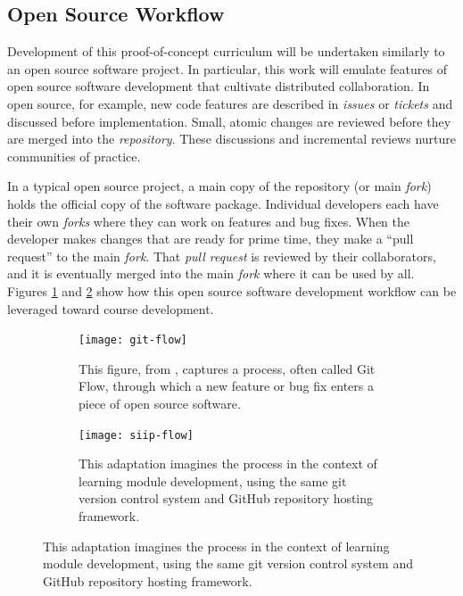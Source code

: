 \documentclass[11pt]{article}
\begin{document}
          \subsection{Open Source Workflow}
          Development of this proof-of-concept curriculum will be undertaken 
          similarly to an open source software project. 
          In particular, this work will emulate features of open source software development 
          that cultivate distributed collaboration. In open source, for 
          example, new code features are described in \emph{issues} or 
          \emph{tickets} and discussed before implementation. Small, atomic 
          changes are reviewed before they are merged into the 
          \emph{repository}. These discussions and incremental reviews nurture 
          communities of practice.

          In a typical open source project, a main copy of the 
          repository (or main \emph{fork}) holds the 
          official copy of the software package. Individual developers each have their own 
          \emph{forks} where they can work on features and 
          bug fixes. When the developer makes changes that are ready for prime 
          time, they make a ``pull request'' to the main \emph{fork}. That 
          \emph{pull request} is 
          reviewed by their collaborators, and it is eventually merged into the 
          main \emph{fork} where it can be used by all. Figures 
          \ref{fig:sub1} and \ref{fig:sub2} show how this open source software 
          development workflow
          can be leveraged toward course development.

          \begin{figure}
                  \centering
                  \begin{subfigure}{.4\textwidth}
                            \centering
                              \texttt{[image: git-flow]}
        \caption{This figure, from \cite{scopatz_effective_2015}, captures a 
                          process, often called Git Flow, through which a new 
                          feature or bug fix enters a piece of open source 
                          software.}
                                  \label{fig:sub1}
                  \end{subfigure}\hfill%
                  \begin{subfigure}{.4\textwidth}
                            \centering
                              \texttt{[image: siip-flow]}
  \caption{This adaptation imagines the process in the context of learning module development, using the same git version control system and GitHub repository hosting framework.}
                                  \label{fig:sub2}
                  \end{subfigure}
                  \label{fig:test}
          \end{figure}
          \FloatBarrier
\end{document}
